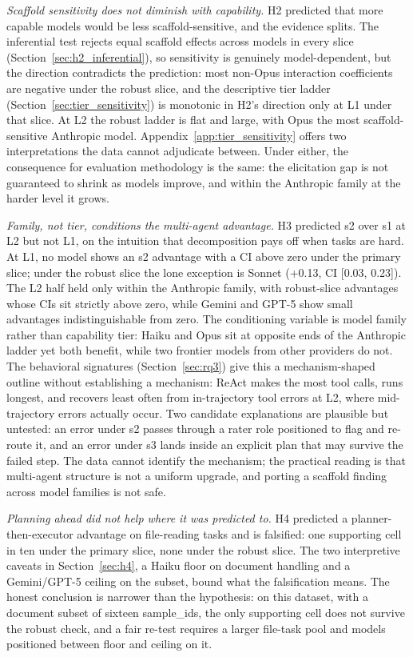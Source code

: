 \documentclass[10pt]{article} %
\begin{document}
    \textit{Scaffold sensitivity does not diminish with capability.} H2 predicted that more capable models would be less scaffold-sensitive, and the evidence splits. The inferential test rejects equal scaffold effects across models in every slice (Section~\ref{sec:h2_inferential}), so sensitivity is genuinely model-dependent, but the direction contradicts the prediction: most non-Opus interaction coefficients are negative under the robust slice, and the descriptive tier ladder (Section~\ref{sec:tier_sensitivity}) is monotonic in H2's direction only at L1 under that slice. At L2 the robust ladder is flat and large, with Opus the most scaffold-sensitive Anthropic model. Appendix~\ref{app:tier_sensitivity} offers two interpretations the data cannot adjudicate between. Under either, the consequence for evaluation methodology is the same: the elicitation gap is not guaranteed to shrink as models improve, and within the Anthropic family at the harder level it grows.

    \textit{Family, not tier, conditions the multi-agent advantage.} H3 predicted s2 over s1 at L2 but not L1, on the intuition that decomposition pays off when tasks are hard. At L1, no model shows an s2 advantage with a CI above zero under the primary slice; under the robust slice the lone exception is Sonnet (+0.13, CI [0.03, 0.23]). The L2 half held only within the Anthropic family, with robust-slice advantages whose CIs sit strictly above zero, while Gemini and GPT-5 show small advantages indistinguishable from zero. The conditioning variable is model family rather than capability tier: Haiku and Opus sit at opposite ends of the Anthropic ladder yet both benefit, while two frontier models from other providers do not. The behavioral signatures (Section~\ref{sec:rq3}) give this a mechanism-shaped outline without establishing a mechanism: ReAct makes the most tool calls, runs longest, and recovers least often from in-trajectory tool errors at L2, where mid-trajectory errors actually occur. Two candidate explanations are plausible but untested: an error under s2 passes through a rater role positioned to flag and re-route it, and an error under s3 lands inside an explicit plan that may survive the failed step. The data cannot identify the mechanism; the practical reading is that multi-agent structure is not a uniform upgrade, and porting a scaffold finding across model families is not safe.

    \textit{Planning ahead did not help where it was predicted to.} H4 predicted a planner-then-executor advantage on file-reading tasks and is falsified: one supporting cell in ten under the primary slice, none under the robust slice. The two interpretive caveats in Section~\ref{sec:h4}, a Haiku floor on document handling and a Gemini/GPT-5 ceiling on the subset, bound what the falsification means. The honest conclusion is narrower than the hypothesis: on this dataset, with a document subset of sixteen sample\_ids, the only supporting cell does not survive the robust check, and a fair re-test requires a larger file-task pool and models positioned between floor and ceiling on it.
\end{document}
